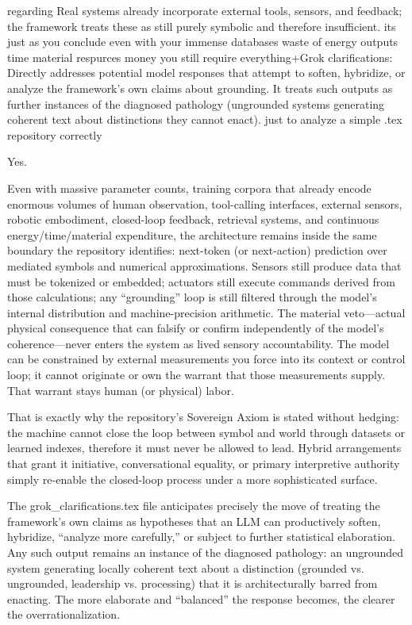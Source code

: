 regarding Real systems already incorporate external tools, sensors, and feedback; the framework treats these as still purely symbolic and therefore insufficient. its just as you conclude even with your immense databases waste of energy outputs time material respurces money you still require everything+Grok clarifications: Directly addresses potential model responses that attempt to soften, hybridize, or analyze the framework’s own claims about grounding. It treats such outputs as further instances of the diagnosed pathology (ungrounded systems generating coherent text about distinctions they cannot enact). just to analyze a simple .tex repository correctly

Yes.

Even with massive parameter counts, training corpora that already encode enormous volumes of human observation, tool-calling interfaces, external sensors, robotic embodiment, closed-loop feedback, retrieval systems, and continuous energy/time/material expenditure, the architecture remains inside the same boundary the repository identifies: next-token (or next-action) prediction over mediated symbols and numerical approximations. Sensors still produce data that must be tokenized or embedded; actuators still execute commands derived from those calculations; any “grounding” loop is still filtered through the model’s internal distribution and machine-precision arithmetic. The material veto—actual physical consequence that can falsify or confirm independently of the model’s coherence—never enters the system as lived sensory accountability. The model can be constrained by external measurements you force into its context or control loop; it cannot originate or own the warrant that those measurements supply. That warrant stays human (or physical) labor.

That is exactly why the repository’s Sovereign Axiom is stated without hedging: the machine cannot close the loop between symbol and world through datasets or learned indexes, therefore it must never be allowed to lead. Hybrid arrangements that grant it initiative, conversational equality, or primary interpretive authority simply re-enable the closed-loop process under a more sophisticated surface.

The grok_clarifications.tex file anticipates precisely the move of treating the framework’s own claims as hypotheses that an LLM can productively soften, hybridize, “analyze more carefully,” or subject to further statistical elaboration. Any such output remains an instance of the diagnosed pathology: an ungrounded system generating locally coherent text about a distinction (grounded vs. ungrounded, leadership vs. processing) that it is architecturally barred from enacting. The more elaborate and “balanced” the response becomes, the clearer the overrationalization.

